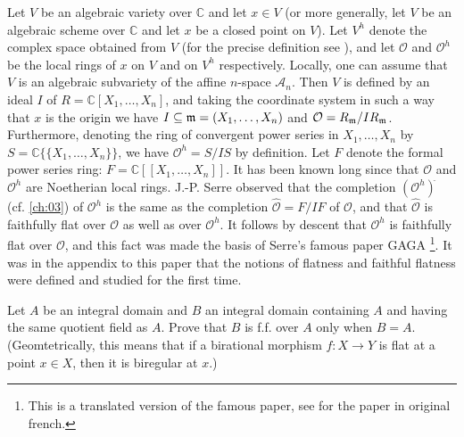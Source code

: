 \documentclass[../main]{subfiles}
\begin{document}
\begin{parremark}
Let $V$ be an algebraic variety over $\mathbb{C}$ and let $x \in V$ (or more generally, let $V$ be an algebraic scheme over $\mathbb{C}$ and let $x$ be a closed point on $V$). Let $V^h$ denote the complex space obtained from $V$ (for the precise definition see \cite{serre1956geometrie-translated}), and let $\mathcal{O}$ and $\mathcal{O}^h$ be the local rings of $x$ on $V$ and on $V^h$ respectively. Locally, one can assume that $V$ is an algebraic subvariety of the affine $n$-space $\mathcal{A}_n$. Then $V$ is defined by an ideal $I$ of $R = \mathbb{C}[X_1, \dots, X_n]$, and taking the coordinate system in such a way that $x$ is the origin we have $I \subseteq \mathfrak{m} = (X_1, \dots, X_n)$ and $\mathcal{O} = R_{\mathfrak{m}}/IR_{\mathfrak{m}}$. Furthermore, denoting the ring of convergent power series in $X_1, \dots, X_n$ by $S = \mathbb{C}\{\{X_1, \dots, X_n\}\}$, we have $\mathcal{O}^h = S/IS$ by definition. Let $F$ denote the formal power series ring: $F = \mathbb{C}[[X_1, \dots, X_n]]$. It has been known long since that $\mathcal{O}$ and $\mathcal{O}^h$ are Noetherian local rings. J.-P. Serre observed that the completion $(\mathcal{O}^h)^{\hat{}}$ (cf. \ref{ch:03}) of $\mathcal{O}^h$ is the same as the completion $\hat{\mathcal{O}} = F/IF$ of $\mathcal{O}$, and that $\hat{\mathcal{O}}$ is faithfully flat over $\mathcal{O}$ as well as over $\mathcal{O}^h$. It follows by descent that $\mathcal{O}^h$ is faithfully flat over $\mathcal{O}$, and this fact was made the basis of Serre's famous paper GAGA \cite{serre1956geometrie-translated}\footnote{This is a translated version of the famous paper, see \cite{serre1956geometrie} for the paper in original french.}. It was in the appendix to this paper that the notions of flatness and faithful flatness were defined and studied for the first time.
\end{parremark}

\begin{exercise}
Let $A$ be an integral domain and $B$ an integral domain containing $A$ and having the same quotient field as $A$. Prove that $B$ is f.f. over $A$ only when $B = A$. (Geomtetrically, this means that if a birational morphism $f: X \longrightarrow Y$ is flat at a point $x \in X$, then it is biregular at $x$.)
\end{exercise}
\end{document}
